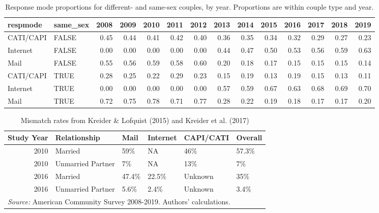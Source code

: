 \documentclass[
  11pt,
]{article}
\begin{document}
\begin{table}[!h]

\caption{\label{tab:respmode}Response mode proportions for different- and same-sex couples, by year. Proportions are within couple type and year.}
\centering
\fontsize{9}{11}\selectfont
\begin{tabular}[t]{llrrrrrrrrrrrr}
\toprule
respmode & same\_sex & 2008 & 2009 & 2010 & 2011 & 2012 & 2013 & 2014 & 2015 & 2016 & 2017 & 2018 & 2019\\
\midrule
CATI/CAPI & FALSE & 0.45 & 0.44 & 0.41 & 0.42 & 0.40 & 0.36 & 0.35 & 0.34 & 0.32 & 0.29 & 0.27 & 0.23\\
Internet & FALSE & 0.00 & 0.00 & 0.00 & 0.00 & 0.00 & 0.44 & 0.47 & 0.50 & 0.53 & 0.56 & 0.59 & 0.63\\
Mail & FALSE & 0.55 & 0.56 & 0.59 & 0.58 & 0.60 & 0.20 & 0.18 & 0.17 & 0.15 & 0.15 & 0.15 & 0.14\\
CATI/CAPI & TRUE & 0.28 & 0.25 & 0.22 & 0.29 & 0.23 & 0.15 & 0.19 & 0.13 & 0.19 & 0.15 & 0.13 & 0.11\\
Internet & TRUE & 0.00 & 0.00 & 0.00 & 0.00 & 0.00 & 0.57 & 0.59 & 0.67 & 0.63 & 0.68 & 0.69 & 0.70\\
\addlinespace
Mail & TRUE & 0.72 & 0.75 & 0.78 & 0.71 & 0.77 & 0.28 & 0.22 & 0.19 & 0.18 & 0.17 & 0.17 & 0.20\\
\bottomrule
\end{tabular}
\end{table}

\begin{table}[!h]

\caption{\label{tab:mismatch}Mismatch rates from Kreider \& Lofquist (2015) and Kreider et al. (2017)}
\centering
\begin{tabular}[t]{rlllll}
\toprule
Study Year & Relationship & Mail & Internet & CAPI/CATI & Overall\\
\midrule
2010 & Married & 59\% & NA & 46\% & 57.3\%\\
2010 & Unmarried Partner & 7\% & NA & 13\% & 7\%\\
2016 & Married & 47.4\% & 22.5\% & Unknown & 35\%\\
2016 & Unmarried Partner & 5.6\% & 2.4\% & Unknown & 3.4\%\\
\bottomrule
\multicolumn{6}{l}{\rule{0pt}{1em}\textit{Source:} American Community Survey 2008-2019. Authors' calculations.}\\
\end{tabular}
\end{table}
\end{document}
